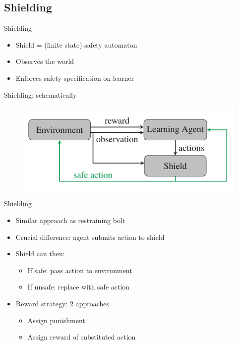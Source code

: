 \documentclass[kul]{kulakbeamer}
\begin{document}
\subsection{Shielding}
\begin{frame}{Shielding}
    \begin{itemize}
        \item Shield = (finite state) safety automaton
        \item Observes the world
        \item Enforces safety specification on learner
    \end{itemize}
\end{frame}
\begin{frame}{Shielding: schematically}
    \begin{figure}
        \centering
        \includegraphics[width=\textwidth]{Shielding.png}
    \end{figure}
\end{frame}
\begin{frame}{Shielding}
    \begin{itemize}
        \item Similar approach as restraining bolt
        \item Crucial difference: agent submits action to shield
        \item Shield can then:
        \begin{itemize}
            \item If safe: pass action to environment
            \item If unsafe: replace with safe action
        \end{itemize}
        \item Reward strategy: 2 approaches
        \begin{itemize}
            \item Assign punishment
            \item Assign reward of substituted action
        \end{itemize}
    \end{itemize}
\end{frame}
\end{document}
